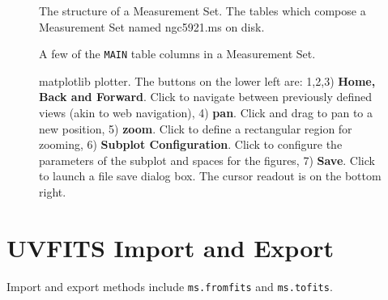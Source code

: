 \begin{figure}[ht]
\caption{\label{fig:tablekeyword} The structure of a Measurement
  Set. The tables which compose a Measurement Set named ngc5921.ms on
  disk.}
\hrulefill
\end{figure}
 
\begin{figure}[h]
\caption{\label{fig:tablekeyword2} A few of the {\tt MAIN} table columns in a
  Measurement Set.} 
\hrulefill
\end{figure}
 
\begin{figure}[hb]
\caption{\label{fig:matplotlib2} matplotlib plotter. The buttons on the
  lower left are: 1,2,3) {\bf Home, Back and Forward}. Click to navigate
  between previously defined views (akin to web navigation), 4)
  {\bf pan}. Click and drag to pan to a new position, 5) {\bf zoom}. Click to
  define a rectangular region for zooming, 6) {\bf Subplot
  Configuration}. Click to configure the parameters of the subplot and
  spaces for the figures, 7) {\bf Save}. Click to launch a file save
  dialog box. The cursor readout is on the bottom right.}
\hrulefill
\end{figure}




\section{UVFITS Import and Export}
\label{section:iotool.uvfits}

Import and export methods include {\tt ms.fromfits} and
{\tt ms.tofits}.


